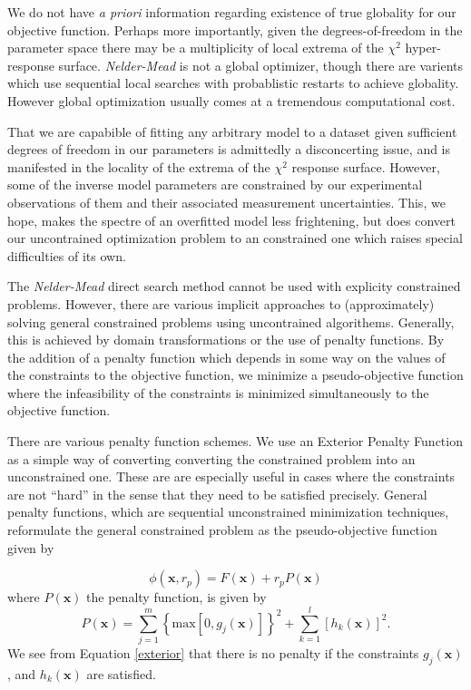 \documentclass[10pt,a4paper]{article}
\begin{document}
We do not have \emph{a priori} information regarding existence of true globality for our objective function. Perhaps more importantly, given the degrees-of-freedom in the parameter space there may be a multiplicity of local extrema of the $\chi^2$ hyper-response surface. \emph{Nelder-Mead} is not a global optimizer, though there are varients which use sequential local searches with probablistic restarts to achieve globality. However global optimization usually comes at a tremendous computational cost.

That we are capabible of fitting any arbitrary model to a dataset given sufficient degrees of freedom in our parameters is admittedly a disconcerting issue, and is manifested in the locality of the extrema of the $\chi^2$ response surface. However, some of the inverse model parameters are constrained by our experimental observations of them and their associated measurement uncertainties. This, we hope, makes the spectre of an overfitted model less frightening, but does convert our uncontrained optimization problem to an constrained one which raises special difficulties of its own. 

The \emph{Nelder-Mead} direct search method cannot be used with explicity constrained problems. However, there are various implicit approaches to (approximately) solving general constrained problems using uncontrained algorithems. Generally, this is achieved by domain transformations or the use of penalty functions.  By the addition of a penalty function which depends in some way on the values of the constraints to the objective function, we minimize a pseudo-objective function where the infeasibility of the constraints is minimized simultaneously to the objective function. 

There are various penalty function schemes. We use an Exterior Penalty Function as a simple way of converting converting the constrained problem into an unconstrained one. These are are especially useful in cases where the constraints are not ``hard'' in the sense that they need to be satisfied precisely. General penalty functions, which are sequential unconstrained minimization techniques, reformulate the general constrained problem as the pseudo-objective function given by

\[ \phi(\mathbf{x}, r_p ) = F(\mathbf{x}) + r_p P(\mathbf{x}) \]
where $P \left( \mathbf{x} \right)$ the penalty function, is given by
\begin{equation} \label{exterior}
 P( \mathbf{x} ) = \sum_{j = 1}^m \left\lbrace \mbox{max} \left[ 0, g_j(\mathbf{x} ) \right] \right\rbrace^2 + 
\sum_{k = 1}^l \left[ h_k( \mathbf{x}) \right]^2 .
\end{equation}
We see from Equation \ref{exterior} that there is no penalty if the constraints $g_j(\mathbf{x})$, and $h_k(\mathbf{x})$ are satisfied.
 
\end{document}
